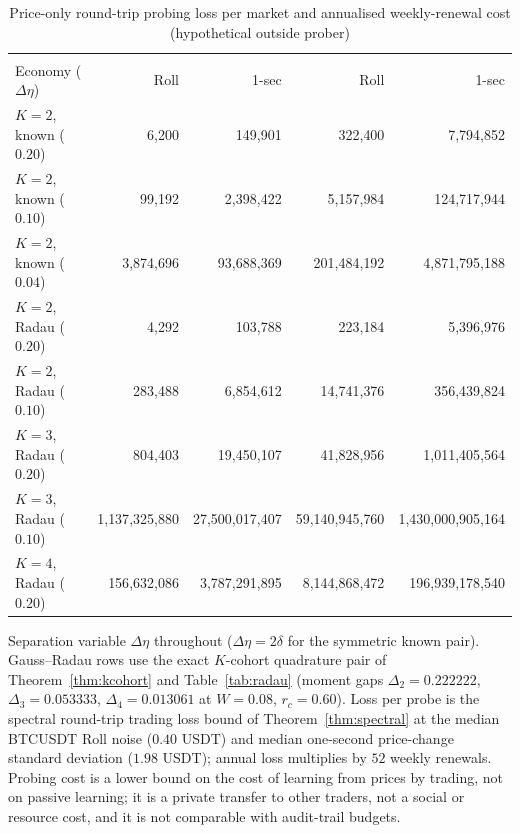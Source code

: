 \documentclass[12pt]{article}
\theoremstyle{definition}
\theoremstyle{remark}
\begin{document}
\begin{table}[t]\centering\footnotesize
\begin{threeparttable}
\caption{Price-only round-trip probing loss per market and annualised weekly-renewal cost (hypothetical outside prober)}\label{tab:cat_dollars}
\setlength{\tabcolsep}{1.5pt}
\begin{tabular}{@{}>{\scriptsize}l*{4}{>{\scriptsize}r}@{}}
\toprule
 & \multicolumn{2}{c}{\scriptsize Loss / probe (USDT)} & \multicolumn{2}{c}{\scriptsize Annual ($52\times$, USDT)}\\
Economy ($\Delta\eta$) & Roll & 1-sec & Roll & 1-sec\\
\midrule
$K=2$, known ($0.20$) & 6{,}200 & 149{,}901 & 322{,}400 & 7{,}794{,}852\\
$K=2$, known ($0.10$) & 99{,}192 & 2{,}398{,}422 & 5{,}157{,}984 & 124{,}717{,}944\\
$K=2$, known ($0.04$) & 3{,}874{,}696 & 93{,}688{,}369 & 201{,}484{,}192 & 4{,}871{,}795{,}188\\
\midrule
$K=2$, Radau ($0.20$) & 4{,}292 & 103{,}788 & 223{,}184 & 5{,}396{,}976\\
$K=2$, Radau ($0.10$) & 283{,}488 & 6{,}854{,}612 & 14{,}741{,}376 & 356{,}439{,}824\\
$K=3$, Radau ($0.20$) & 804{,}403 & 19{,}450{,}107 & 41{,}828{,}956 & 1{,}011{,}405{,}564\\
$K=3$, Radau ($0.10$) & 1{,}137{,}325{,}880 & 27{,}500{,}017{,}407 & 59{,}140{,}945{,}760 & 1{,}430{,}000{,}905{,}164\\
$K=4$, Radau ($0.20$) & 156{,}632{,}086 & 3{,}787{,}291{,}895 & 8{,}144{,}868{,}472 & 196{,}939{,}178{,}540\\
\bottomrule
\end{tabular}
\begin{tablenotes}\footnotesize\item Separation variable $\Delta\eta$ throughout ($\Delta\eta=2\delta$ for the symmetric known pair). Gauss--Radau rows use the exact $K$-cohort quadrature pair of Theorem~\ref{thm:kcohort} and Table~\ref{tab:radau} (moment gaps $\Delta_2=0.222222$, $\Delta_3=0.053333$, $\Delta_4=0.013061$ at $W=0.08$, $r_c=0.60$). Loss per probe is the spectral round-trip trading loss bound of Theorem~\ref{thm:spectral} at the median BTCUSDT Roll noise ($0.40$ USDT) and median one-second price-change standard deviation ($1.98$ USDT); annual loss multiplies by $52$ weekly renewals. Probing cost is a lower bound on the cost of learning from prices by trading, not on passive learning; it is a private transfer to other traders, not a social or resource cost, and it is not comparable with audit-trail budgets.\end{tablenotes}
\end{threeparttable}
\end{table}
\end{document}
